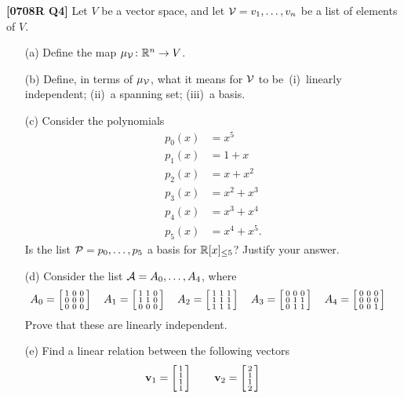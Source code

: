 \documentclass[a4paper]{article}
\begin{document}
\begin{problem}\textbf{[0708R Q4]}
 Let $V$ be a vector space, and let $\mathcal{V}=v_1,\dotsc,v_n$ be
 a list of elements of $V$.  
 \begin{itemize}
  \item[(a)] Define the map $\mu_{\mathcal{V}}\colon{\mathbb{R}}^n\to V$. 
  \item[(b)] Define, in terms of $\mu_{\mathcal{V}}$, what it means
   for $\mathcal{V}$ to be~(i)~linearly independent; (ii)~a spanning
   set; (iii)~a basis. 
  \item[(c)] Consider the polynomials 
   \begin{align*}
    p_0(x) &= x^5 \\
    p_1(x) &= 1+x \\
    p_2(x) &= x+x^2 \\
    p_3(x) &= x^2+x^3 \\
    p_4(x) &= x^3+x^4 \\
    p_5(x) &= x^4+x^5.
   \end{align*}
   Is the list $\mathcal{P}=p_0,\dotsc,p_5$ a basis for ${\mathbb{R}}[x]_{\leq 5}$?
   Justify your answer. 
  \item[(d)] Consider the list $\mathcal{A}=A_0,\dotsc,A_4$, where
   {\tiny \[
    A_0 = \left[\begin{smallmatrix} 1&0&0\\0&0&0\\0&0&0\end{smallmatrix}\right] \hspace{1em}
    A_1 = \left[\begin{smallmatrix} 1&1&0\\1&1&0\\0&0&0\end{smallmatrix}\right] \hspace{1em}
    A_2 = \left[\begin{smallmatrix} 1&1&1\\1&1&1\\1&1&1\end{smallmatrix}\right] \hspace{1em}
    A_3 = \left[\begin{smallmatrix} 0&0&0\\0&1&1\\0&1&1\end{smallmatrix}\right] \hspace{1em}
    A_4 = \left[\begin{smallmatrix} 0&0&0\\0&0&0\\0&0&1\end{smallmatrix}\right] \hspace{1em}
   \]}
   Prove that these are linearly independent. 
  \item[(e)] Find a linear relation between the following vectors  
   \[ \mathbf{v}_1 = \left[\begin{smallmatrix} 1\\ 1\\ 1\\ 1 \end{smallmatrix}\right] \hspace{2em}
      \mathbf{v}_2 = \left[\begin{smallmatrix} 2\\ 1\\ 1\\ 2 \end{smallmatrix}\right] \hspace{2em}
\]
\end{itemize}
\end{problem}
\end{document}
